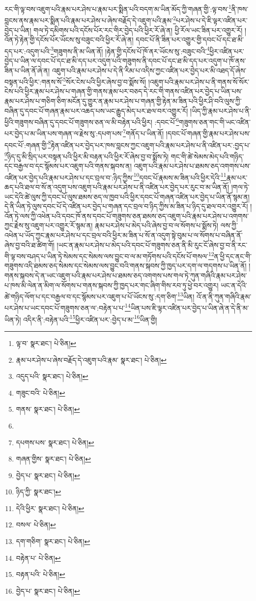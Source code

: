 རང་གི་ལྟ་བས་འཇུག་པའི་རྣམ་པར་ཤེས་པ་རྣམ་པར་སྨིན་པའི་བདག་མ་ཡིན་མོད་ཀྱི་གཞན་གྱི་:ལྟ་བས་\footnote{ལྟ་བ་  སྣར་ཐང་།  པེ་ཅིན། }ནི་ཁས་བླངས་ནས་རྣམ་པར་སྨིན་པའི་རྣམ་པར་ཤེས་པ་ཞེས་བརྗོད་དེ་འཇུག་པའི་རྣམ་\footnote{རྣམ་པར་ཤེས་པ་ཞེས་བརྗོད་དེ་འཇུག་པའི་རྣམ་  སྣར་ཐང་།  པེ་ཅིན། }པར་ཤེས་པ་དེ་ཇི་ལྟར་འཛིན་པར་བྱེད་པ་ཡིན། གལ་ཏེ་དམིགས་པའི་དངོས་པོར་རང་གིར་བྱེད་པའི་ཕྱིར་རོ་ཞེ་ན། ཕྱི་རོལ་ཡང་ཟིན་པར་འགྱུར་རོ། །འོན་ཏེ་རྟེན་གྱི་དངོས་པོར་ཡོངས་སུ་བཟུང་བའི་ཕྱིར་རོ་ཞེ་ན། དབང་པོ་ནི་ཟིན་པར་འགྱུར་གྱི་དབང་པོ་དང་ཐ་མི་དད་པར་:འདུག་པའི་\footnote{འདུད་པའི་  སྣར་ཐང་།  པེ་ཅིན། }གཟུགས་ནི་མ་ཡིན་ནོ། །རྟེན་གྱི་དངོས་པོ་ཁོ་ནར་ཡོངས་སུ་:བཟུང་བའི་\footnote{གཟུང་བའི་  པེ་ཅིན། }ཕྱིར་འཛིན་པར་བྱེད་པ་ཡིན་ལ་དབང་པོ་དང་ཐ་མི་དད་པར་འདུག་པའི་གཟུགས་ནི་དབང་པོ་དང་ཐ་མི་དད་པར་འདུག་པ་ཁོ་ནས་ཟིན་པ་ཡིན་ནོ་ཞེ་ན། འཇུག་པའི་རྣམ་པར་ཤེས་པ་དེ་ནི་རིམ་པ་འདིས་ཀྱང་འཛིན་པར་བྱེད་པར་མི་འཐད་དོ་ཞེས་བསྟན་པའི་ཕྱིར་:གནས་སོ་\footnote{གནས་  སྣར་ཐང་།  པེ་ཅིན། }སོར་ངེས་པའི་ཕྱིར་ཞེས་བྱ་བ་སྨོས་སོ། །འཇུག་པའི་རྣམ་པར་ཤེས་པ་ནི་གནས་སོ་སོར་ངེས་པའི་ཕྱིར་རྣམ་པར་ཤེས་པ་གཞན་གྱི་གནས་རྣམ་པར་བཅད་དེ་རང་གི་གནས་འཛིན་པར་བྱེད་པ་ཡིན་པས་རྣམ་པར་ཤེས་པ་གཅིག་ཅིག་མངོན་དུ་གྱུར་ན་རྣམ་པར་ཤེས་པ་གཞན་གྱི་རྟེན་མ་ཟིན་པའི་ཕྱིར་ཤི་བའི་ལུས་ཀྱི་བཞིན་དུ་དབང་པོ་གཞན་རྣམ་པར་འཆད་པས་ཡང་རྒྱུད་མེད་པར་ཐལ་བར་འགྱུར་རོ། །ཡིད་ཀྱི་རྣམ་པར་ཤེས་པ་ནི་ཕྱིའི་གཟུགས་བཞིན་དུ་དབང་པོ་གཟུགས་ཅན་ལ་མི་བརྟེན་པའི་ཕྱིར། :དབང་པོ་\footnote{}གཟུགས་ཅན་གང་གི་ཡང་འཛིན་པར་བྱེད་པ་མ་ཡིན་པས་གཞན་ལ་རྗེས་སུ་:དཔག་པས་\footnote{དཔགས་པས་  སྣར་ཐང་།  པེ་ཅིན། }གནོད་པ་ཡིན་ནོ། །དབང་པོ་གཞན་གྱི་རྣམ་པར་ཤེས་པས་དབང་པོ་:གཞན་གྱི་\footnote{གཞན་གྱིས་  སྣར་ཐང་།  པེ་ཅིན། }རྟེན་འཛིན་པར་བྱེད་པར་ཁས་བླངས་ཀྱང་འཇུག་པའི་རྣམ་པར་ཤེས་པ་ནི་འཛིན་པར་:བྱད་པ་\footnote{བྱེད་པ་  སྣར་ཐང་།  པེ་ཅིན། }ཉིད་དུ་མི་སྲིད་པར་བསྟན་པའི་ཕྱིར་མི་བརྟན་པའི་ཕྱིར་རོ་ཞེས་བྱ་བ་སྨོས་ཏེ། གང་གི་ཚེ་སེམས་མེད་པའི་གཉིད་དང་བརྒྱལ་བ་དང་སྙོམས་པར་འཇུག་པའི་གནས་སྐབས་ན། འཇུག་པའི་རྣམ་པར་ཤེས་པ་ཐམས་ཅད་འགགས་པས་འཛིན་པར་བྱེད་པའི་རྣམ་པར་ཤེས་པ་དང་བྲལ་བ་:ཉིད་ཀྱིས་\footnote{ཉིད་ཀྱི་  སྣར་ཐང་། }དབང་པོ་རྣམས་མ་ཟིན་པའི་ཕྱིར་དེའི་\footnote{དེའི་ཕྱིར་  སྣར་ཐང་།  པེ་ཅིན། }རྣམ་པར་ཆད་པའི་ཐལ་བ་སོ་ན་འདུག་པས་འཇུག་པའི་རྣམ་པར་ཤེས་པ་ནི་འཛིན་པར་བྱེད་པར་རུང་བ་མ་ཡིན་ནོ། །གལ་ཏེ་ཡང་དེའི་ཚེ་ལུས་ཀྱི་དབང་པོ་ལུས་ཐམས་ཅད་ལ་ཁྱབ་པའི་ཕྱིར་དབང་པོ་གཞན་འཛིན་པར་བྱེད་པ་ཡིན་ནོ་སྙམ་ན། དེ་ནི་ཡིན་ཏེ་ལུས་དབང་པོ་དེ་འཛིན་པར་བྱེད་པ་གཞན་དང་བྲལ་བ་ཉིད་ཀྱིས་མ་ཟིན་པ་ཉིད་དུ་ཐལ་བར་འགྱུར་རོ། །འོན་ཏེ་ལས་ཀྱི་འཕེན་པའི་དབང་ཁོ་ནས་དབང་པོ་གཟུགས་ཅན་ཐམས་ཅད་འཇུག་པའི་རྣམ་པར་ཤེས་པ་འགགས་ཀྱང་རྗེས་སུ་འཇུག་པར་འགྱུར་རོ་སྙམ་ན། རྣམ་པར་ཤེས་པ་མེད་པའི་ཞེས་བྱ་བ་ལ་སོགས་པ་སྨོས་ཏེ། ལས་ཀྱི་འཕེན་པ་ཡོད་ཀྱང་རྣམ་པར་ཤེས་པ་དང་བྲལ་བའི་ཕྱིར་མ་ཟིན་པ་སོ་ན་འདུག་སྟེ་བུམ་པ་ལ་སོགས་པ་བཞིན་ནོ་ཞེས་བྱ་བའི་ཐ་ཚིག་གོ། །ཡང་ན་རྣམ་པར་ཤེས་པ་མེད་པའི་དབང་པོ་གཟུགས་ཅན་ནི་མི་རུང་ངོ་ཞེས་བྱ་བ་ནི་རང་གི་ལྟ་བས་བཤད་པ་ཡིན་ཏེ་སེམས་དང་སེམས་ལས་བྱུང་བ་ལ་མ་གཏོགས་པའི་དངོས་པོ་གསལ་\footnote{བསལ་  པེ་ཅིན། }ན་ཕྱི་དང་ནང་གི་གཟུགས་འདི་ཐམས་ཅད་སེམས་དང་སེམས་ལས་བྱུང་བའི་གནས་སྐབས་ཀྱི་ཁྱད་པར་དག་ལ་གདགས་པ་ཡིན་ནོ། །གནས་སྐབས་དེ་ན་ཡང་འཇུག་པའི་རྣམ་པར་ཤེས་པ་ཐམས་ཅད་འགགས་པས་གལ་ཏེ་ཀུན་གཞིའི་རྣམ་པར་ཤེས་པ་ཁས་མི་ལེན་ན་མིག་ལ་སོགས་པ་གནས་སྐབས་ཀྱི་ཁྱད་པར་གང་ཞིག་གིས་རབ་ཏུ་ཕྱེ་བར་འགྱུར། ཡང་ན་དེའི་ཚེ་གཉིད་ལོག་པ་དང་བརྒྱལ་བ་དང་སྙོམས་པར་འཇུག་པ་པོ་ཡོངས་སུ་:དག་ཅིག་\footnote{དག་གཅིག་  སྣར་ཐང་།  པེ་ཅིན། }ཡིན། འོ་ན་ནི་ཀུན་གཞིའི་རྣམ་པར་ཤེས་པ་ཡང་དབང་པོ་གཟུགས་ཅན་ལ་:བརྟེན་པ་པ་\footnote{བརྟེན་པ་  པེ་ཅིན། }ཡིན་པས་ཇི་ལྟར་འཛིན་པར་བྱེད་པ་ཡིན་ཞེ་ན་དེ་ནི་མ་ཡིན་ཏེ། འདིར་ནི་:བརྟེན་པའི་\footnote{བརྟན་པའི་  པེ་ཅིན། }ཕྱིར་འཛིན་པར་:བྱེད་པ་མ་\footnote{བྱེད་པ་  སྣར་ཐང་།  པེ་ཅིན། }ཡིན་གྱི། 